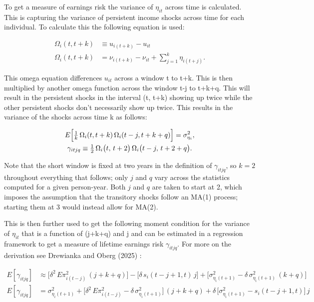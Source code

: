 \documentclass[12pt]{article}
\begin{document}
\begin{onehalfspace}
To get a measure of earnings risk the variance of $\eta_{it}$ across time is calculated. This is capturing the variance of persistent income shocks across time for each individual. To calculate this the following equation is used:

\vspace{-0.75cm}

\begin{align}
\Omega_i(t,t+k)
&\equiv u_{i(t+k)} - u_{it}\\[1ex]
\Omega_i(t,t+k)
&= \nu_{i(t+k)} - \nu_{it}
  + \sum_{j=1}^k \eta_{i(t+j)}.
\end{align}

\vspace{-0.25cm}

This omega equation differences $u_{it}$ across a window t to t+k. This is then multiplied by another omega function across the window t-j to t+k+q. This will result in the persistent shocks in the interval (t, t+k) showing up twice while the other persistent shocks don't necessarily show up twice. This results in the variance of the shocks across time k as follows:

\vspace{-0.5cm}

\begin{gather}
E\Bigl[\tfrac{1}{k}\,\Omega_i(t,t+k)\,\Omega_i(t-j,t+k+q)\Bigr]
= \sigma^2_{\eta_i},\\
\gamma_{itjq}
\equiv \tfrac12\,\Omega_i\bigl(t,\,t+2\bigr)\,\Omega_i\bigl(t - j,\,t + 2 + q\bigr).
\end{gather}

Note that the short window is fixed at two years in the definition of $\gamma_{itjq}$, so $k = 2$ throughout everything that follows; only $j$ and $q$ vary across the statistics computed for a given person-year. Both $j$ and $q$ are taken to start at 2, which imposes the assumption that the transitory shocks follow an MA(1) process; starting them at 3 would instead allow for MA(2).

This is then further used to get the following moment condition for the variance of $\eta_{it}$ that is a function of (j+k+q) and j and can be estimated in a regression framework to get a measure of lifetime earnings risk $\gamma_{itjq}$. For more on the derivation see Drewianka and Oberg (2025) \cite{drewianka2025}:

\vspace{-0.75cm}

\begin{align}
E[\gamma_{itjq}]
&\approx
\bigl[\delta^2\,E\pi^2_{i(t-j)}\,(j+k+q)\bigr]
- \bigl[\delta\,s_i(t-j+1,t)\,j\bigr]
+ \bigl[\sigma^2_{\eta_i(t+1)}
  - \delta\,\sigma^2_{\eta_i(t+1)}\,(k+q)\bigr] \\[1ex]
E[\gamma_{itjq}]
&=
\sigma^2_{\eta_i(t+1)}
+ \bigl[\delta^2\,E\pi^2_{i(t-j)} - \delta\,\sigma^2_{\eta_i(t+1)}\bigr]\,(j+k+q)
+ \delta\,\bigl[\sigma^2_{\eta_i(t+1)} - s_i(t-j+1,t)\bigr]\,j
\end{align}


\end{onehalfspace}
\end{document}
